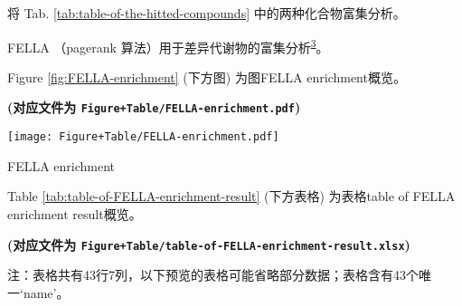 \documentclass[
]{article}
\begin{document}
将 Tab. \ref{tab:table-of-the-hitted-compounds} 中的两种化合物富集分析。

FELLA （pagerank 算法）用于差异代谢物的富集分析\textsuperscript{\protect\hyperlink{ref-FellaAnRPacPicart2018}{3}}。

Figure \ref{fig:FELLA-enrichment} (下方图) 为图FELLA enrichment概览。

\textbf{(对应文件为 \texttt{Figure+Table/FELLA-enrichment.pdf})}

\def\@captype{figure}
\begin{center}
\texttt{[image: Figure+Table/FELLA-enrichment.pdf]}
\caption{FELLA enrichment}\label{fig:FELLA-enrichment}
\end{center}

Table \ref{tab:table-of-FELLA-enrichment-result} (下方表格) 为表格table of FELLA enrichment result概览。

\textbf{(对应文件为 \texttt{Figure+Table/table-of-FELLA-enrichment-result.xlsx})}

\begin{center}\begin{tcolorbox}[colback=gray!10, colframe=gray!50, width=0.9\linewidth, arc=1mm, boxrule=0.5pt]注：表格共有43行7列，以下预览的表格可能省略部分数据；表格含有43个唯一`name'。
\end{tcolorbox}
\end{center}
\end{document}
